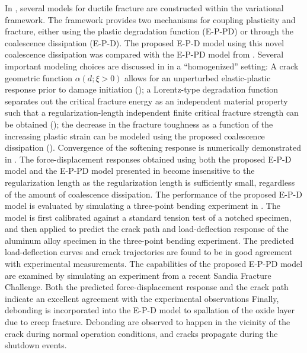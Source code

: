 In , several models for ductile fracture are constructed within the variational framework. The framework provides two mechanisms for coupling  plasticity and fracture, either using the plastic degradation function (E-P-PD) or through the coalescence dissipation (E-P-D). The proposed E-P-D model using this novel coalescence dissipation was compared with the E-P-PD model from \cite{brandon2020cohesive}.
Several important modeling choices are discussed in  in a ``homogenized'' setting:
A crack geometric function $\alpha(d; \xi > 0)$ allows for an unperturbed elastic-plastic response prior to damage initiation ();
a Lorentz-type degradation function separates out the critical fracture energy as an independent material property such that a regularization-length independent finite critical fracture strength can be obtained ();
the decrease in the fracture toughness as a function of the increasing plastic strain can be modeled using the proposed coalescence dissipation ().
Convergence of the softening response is numerically demonstrated in .
The force-displacement responses obtained using both the proposed E-P-D model and the E-P-PD model presented in \cite{brandon2020cohesive} become insensitive to the regularization length as the regularization length is sufficiently small, regardless of the amount of coalescence dissipation.
The performance of the proposed E-P-D model is evaluated by simulating a three-point bending experiment in . The model is first calibrated against a standard tension test of a notched specimen, and then applied to predict the crack path and load-deflection response of the aluminum alloy specimen in the three-point bending experiment.
The predicted load-deflection curves and crack trajectories are found to be in good agreement with experimental measurements. The capabilities of the proposed E-P-PD model are examined by simulating an experiment from a recent Sandia Fracture Challenge. Both the predicted force-displacement response and the crack path indicate an excellent agreement with the experimental observations
Finally, debonding is incorporated into the E-P-D model to spallation of the oxide layer due to creep fracture. Debonding are observed to happen in the vicinity of the crack during normal operation conditions, and cracks propagate during the shutdown events.


